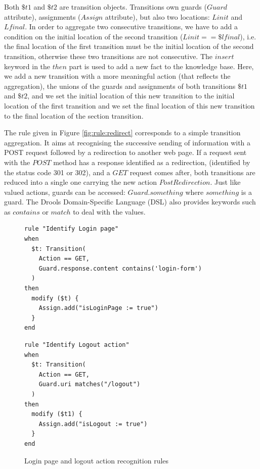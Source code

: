 \begin{itemize}
Both $\$t1$ and $\$t2$ are transition objects. Transitions own
guards ($Guard$ attribute), assignments ($Assign$ attribute), but
also two locations: $Linit$ and $Lfinal$. In order to aggregate
two consecutive transitions, we have to add a condition on the
initial location of the second transition ($Linit == \$lfinal$),
i.e. the final location of the first transition must be the
initial location of the second transition, otherwise these two
transitions are not consecutive. The $insert$ keyword in the
$then$ part is used to add a new fact to the knowledge base.
Here, we add a new transition with a more meaningful action (that
reflects the aggregation), the unions of the guards and
assignments of both transitions $\$t1$ and $\$t2$, and we set the
initial location of this new transition to the initial location
of the first transition and we set the final location of this new
transition to the final location of the section transition.

The rule given in Figure \ref{fig:rule:redirect} corresponds to a
simple transition aggregation. It aims at recognising the
successive sending of information with a POST request followed by
a redirection to another web page.  If a request sent with the
$POST$ method has a response identified as a redirection,
(identified by the status code 301 or 302), and  a $GET$ request
comes after, both transitions are reduced into a single one
carrying the new action $PostRedirection$. Just like valued
actions, guards can be accessed: $Guard.something$ where
$something$ is a guard. The Drools Domain-Specific Language (DSL)
also provides keywords such as $contains$ or $match$ to deal with
the values.
\end{itemize}

\begin{figure}[h]
\begin{framed}
\begin{BVerbatim}
rule "Identify Login page"
when
  $t: Transition(
    Action == GET,
    Guard.response.content contains('login-form')
  )
then
  modify ($t) {
    Assign.add("isLoginPage := true")
  }
end
\end{BVerbatim}
\end{framed}

\begin{framed}
\begin{BVerbatim}
rule "Identify Logout action"
when
  $t: Transition(
    Action == GET,
    Guard.uri matches("/logout")
  )
then
  modify ($t1) {
    Assign.add("isLogout := true")
  }
end
\end{BVerbatim}
\end{framed}

\caption {Login page and logout action recognition rules}
\label{fig:rule:login}
\end{figure}

